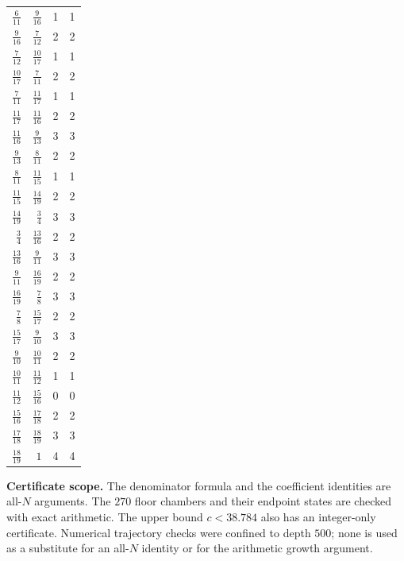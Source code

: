 \documentclass[11pt]{article}
\begin{document}
\begin{longtable}{rrrr}
$\frac{6}{11}$&$\frac{9}{16}$&1&1\\
$\frac{9}{16}$&$\frac{7}{12}$&2&2\\
$\frac{7}{12}$&$\frac{10}{17}$&1&1\\
$\frac{10}{17}$&$\frac{7}{11}$&2&2\\
$\frac{7}{11}$&$\frac{11}{17}$&1&1\\
$\frac{11}{17}$&$\frac{11}{16}$&2&2\\
$\frac{11}{16}$&$\frac{9}{13}$&3&3\\
$\frac{9}{13}$&$\frac{8}{11}$&2&2\\
$\frac{8}{11}$&$\frac{11}{15}$&1&1\\
$\frac{11}{15}$&$\frac{14}{19}$&2&2\\
$\frac{14}{19}$&$\frac{3}{4}$&3&3\\
$\frac{3}{4}$&$\frac{13}{16}$&2&2\\
$\frac{13}{16}$&$\frac{9}{11}$&3&3\\
$\frac{9}{11}$&$\frac{16}{19}$&2&2\\
$\frac{16}{19}$&$\frac{7}{8}$&3&3\\
$\frac{7}{8}$&$\frac{15}{17}$&2&2\\
$\frac{15}{17}$&$\frac{9}{10}$&3&3\\
$\frac{9}{10}$&$\frac{10}{11}$&2&2\\
$\frac{10}{11}$&$\frac{11}{12}$&1&1\\
$\frac{11}{12}$&$\frac{15}{16}$&0&0\\
$\frac{15}{16}$&$\frac{17}{18}$&2&2\\
$\frac{17}{18}$&$\frac{18}{19}$&3&3\\
$\frac{18}{19}$&$1$&4&4\\
\bottomrule
\end{longtable}

\noindent\textbf{Certificate scope.} The denominator formula and the
coefficient identities are all-$N$ arguments. The $270$ floor chambers and
their endpoint states are checked with exact arithmetic. The upper bound
$c<38.784$ also has an integer-only certificate. Numerical trajectory
checks were confined to depth $500$; none is used as a substitute for an
all-$N$ identity or for the arithmetic growth argument.
\end{document}
